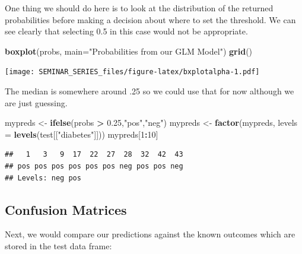 \documentclass[
]{book}
\newenvironment{Shaded}{\begin{snugshade}}{\end{snugshade}}
\newcommand{\CommentTok}[1]{\textcolor[rgb]{0.56,0.35,0.01}{\textit{#1}}}
\newcommand{\DataTypeTok}[1]{\textcolor[rgb]{0.13,0.29,0.53}{#1}}
\newcommand{\DecValTok}[1]{\textcolor[rgb]{0.00,0.00,0.81}{#1}}
\newcommand{\FloatTok}[1]{\textcolor[rgb]{0.00,0.00,0.81}{#1}}
\newcommand{\KeywordTok}[1]{\textcolor[rgb]{0.13,0.29,0.53}{\textbf{#1}}}
\newcommand{\NormalTok}[1]{#1}
\newcommand{\OperatorTok}[1]{\textcolor[rgb]{0.81,0.36,0.00}{\textbf{#1}}}
\newcommand{\StringTok}[1]{\textcolor[rgb]{0.31,0.60,0.02}{#1}}
\begin{document}
One thing we should do here is to look at the distribution of the returned probabilities before making a decision about where to set the threshold. We can see clearly that selecting 0.5 in this case would not be appropriate.

\begin{Shaded}
\begin{Highlighting}[]
\KeywordTok{boxplot}\NormalTok{(probs, }
        \DataTypeTok{main=}\StringTok{"Probabilities from our GLM Model"}\NormalTok{)}
\KeywordTok{grid}\NormalTok{()}
\end{Highlighting}
\end{Shaded}

\texttt{[image: SEMINAR\_SERIES\_files/figure-latex/bxplotalpha-1.pdf]}

The median is somewhere around .25 so we could use that for now although we are just guessing.

\begin{Shaded}
\begin{Highlighting}[]
\NormalTok{mypreds <-}\StringTok{ }\KeywordTok{ifelse}\NormalTok{(probs }\OperatorTok{>}\StringTok{ }\FloatTok{0.25}\NormalTok{,}\StringTok{"pos"}\NormalTok{,}\StringTok{"neg"}\NormalTok{)}
\NormalTok{mypreds <-}\StringTok{ }\KeywordTok{factor}\NormalTok{(mypreds, }\DataTypeTok{levels =} \KeywordTok{levels}\NormalTok{(test[[}\StringTok{"diabetes"}\NormalTok{]]))}
\NormalTok{mypreds[}\DecValTok{1}\OperatorTok{:}\DecValTok{10}\NormalTok{]}
\end{Highlighting}
\end{Shaded}

\begin{verbatim}
##   1   3   9  17  22  27  28  32  42  43 
## pos pos pos pos pos pos neg pos pos neg 
## Levels: neg pos
\end{verbatim}

\hypertarget{confusion-matrices}{%
\subsection{Confusion Matrices}\label{confusion-matrices}}

Next, we would compare our predictions against the known outcomes which are stored in the test data frame:

\begin{Shaded}
\end{Shaded}
\end{document}

